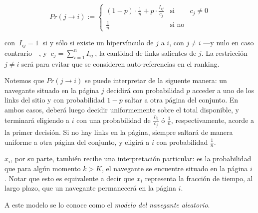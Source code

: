 \vspace{1em}
\begin{equation}
    Pr(j \longrightarrow i) := 
        \left\{ 
            \begin{array}{lcc}
            (1 - p)\cdot \frac{1}{n} + p\cdot \frac{I_{ij}}{c_j}    &  \text{si}    & c_j \neq 0\\
            \frac{1}{n}                                             &  \text{si no} &
            \end{array}
        \right.
\end{equation}

\vspace{1em}
\noindent con $\ I_{ij} = 1\ $ si y sólo si existe un hipervínculo de $j$ a $i$, con $j \neq i$ ---y nulo en caso contrario---, y $\ c_j = \sum_{i=1}^{n}{I_{ij}}\ $, la cantidad de links salientes de $j$. La restricción $j \neq i$ será para evitar que se consideren auto-referencias en el ranking.    

\vspace{1em}
Notemos que $Pr(j \longrightarrow i)$ se puede interpretar de la siguente manera: un navegante situado en la página $j$ decidirá con probabilidad $p$ acceder a uno de los links del sitio y con probabilidad $1 - p$ saltar a otra página del conjunto. En ambos casos, deberá luego decidir uniformemente sobre el total disponible, y terminará eligiendo a $i$ con una probabilidad de $\frac{I_{ij}}{c_j}$ ó $\frac{1}{n}$, respectivamente, acorde a la primer decisión. Si no hay links en la página, siempre saltará de manera uniforme a otra página del conjunto, y eligirá a $i$ con probabilidad $\frac{1}{n}$. 

\vspace{1em}
$x_i$, por su parte, también recibe una interpretación particular: es la probabilidad que para algún momento $k > K$, el navegante se encuentre situado en la página $i$ \cite{Kamvar03}. %
Notar que esto es equivalente a decir que  $x_i$ representa la fracción de tiempo, al largo plazo, que un navegante permanecerá en la página $i$.

\vspace{1em}
\noindent A este modelo se lo conoce como el \textit{modelo del navegante aleatorio}. %



